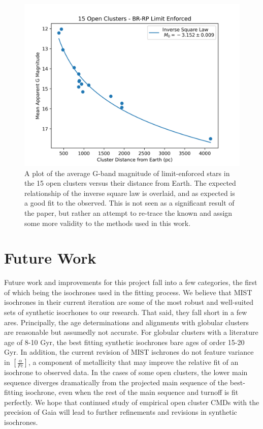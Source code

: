 \documentclass[onecolumn,table,xcdraw,super]{aastex631}
\begin{document}
\begin{figure}[]
    \centering
      \includegraphics[width=4.75in]{figures/mag_vs_dist_bounded.png}
    \caption{A plot of the average G-band magnitude of limit-enforced stars in the 15 open clusters versus their distance from Earth. The expected relationship of the inverse square law is overlaid, and as expected is a good fit to the observed. This is not seen as a significant result of the paper, but rather an attempt to re-trace the known and assign some more validity to the methods used in this work.}
    \label{fig:mag_vs_dist_bounded}
\end{figure}

\section{Future Work} \label{sec:future}

Future work and improvements for this project fall into a few categories, the first of which being the isochrones used in the fitting process. We believe that MIST isochrones in their current iteration are some of the most robust and well-suited sets of synthetic isocrhones to our research. That said, they fall short in a few ares. Principally, the age determinations and alignments with globular clusters are reasonable but assumedly not accurate. For globular clusters with a literature age of 8-10 Gyr, the best fitting synthetic isochrones bare ages of order 15-20 Gyr. In addition, the current revision of MIST ischrones do not feature variance in $[\frac{\alpha}{Fe}]$, a component of metallicity that may improve the relative fit of an isochrone to observed data. In the cases of some open clusters, the lower main sequence diverges dramatically from the projected main sequence of the best-fitting isochrone, even when the rest of the main sequence and turnoff is fit perfectly. We hope that continued study of empirical open cluster CMDs with the precision of Gaia will lead to further refinements and revisions in synthetic isochrones.
\end{document}

